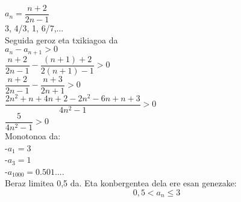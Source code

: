 \begin{adibide}
\item
$a_{n}=\dfrac{n+2}{2n-1}$\\

3, 4/3, 1, 6/7,...\\

Seguida geroz eta txikiagoa da\\

$a_{n}-a_{n+1}>0$\\

$\dfrac{n+2}{2n-1}-\dfrac{(n+1)+2}{2(n+1)-1}>0$\\

$\dfrac{n+2}{2n-1}-\dfrac{n+3}{2n+1}>0$\\

$\dfrac{2n^{2}+n+4n+2-2n^{2}-6n+n+3}{4n^{2}-1}>0$\\

$\dfrac{5}{4n^{2}-1}>0$\\

Monotonoa da:\\

-$a_{1}=3$\\

-$a_{3}=1$\\

-$a_{1000}=0.501....$\\

Beraz limitea 0,5 da. Eta konbergentea dela ere esan genezake:\\
$$0,5 < a_{n} \leqslant 3$$\\
\end{adibide}

